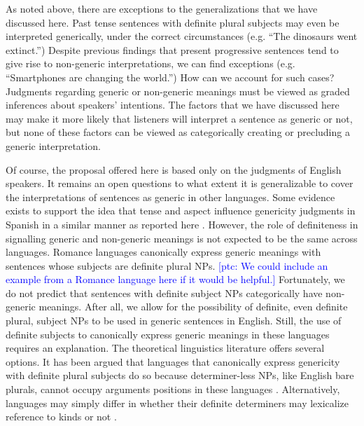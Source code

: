 \documentclass[10pt,letterpaper]{article}
\newcommand{\ptc}[1]{\textcolor{Blue}{[ptc: #1]}}
\begin{document}
As noted above, there are exceptions to the generalizations that we have discussed here. Past tense sentences with definite plural subjects may even be interpreted generically, under the correct circumstances (e.g. ``The dinosaurs went extinct.'') Despite previous findings that present progressive sentences tend to give rise to non-generic interpretations, we can find exceptions (e.g. ``Smartphones are changing the world.'') How can we account for such cases? Judgments regarding generic or non-generic meanings must be viewed as graded inferences about speakers' intentions. The factors that we have discussed here may make it more likely that listeners will interpret a sentence as generic or not, but none of these factors can be viewed as categorically creating or precluding a generic interpretation.

Of course, the proposal offered here is based only on the judgments of English speakers. It remains an open questions to what extent it is generalizable to cover the interpretations of sentences as generic in other languages. Some evidence exists to support the idea that tense and aspect influence genericity judgments in Spanish in a similar manner as reported here \cite{Perez-Leroux:2004}. However, the role of definiteness in signalling generic and non-generic meanings is not expected to be the same across languages. Romance languages canonically express generic meanings with sentences whose subjects are definite plural NPs. \ptc{We could include an example from a Romance language here if it would be helpful.} Fortunately, we do not predict that sentences with definite subject NPs categorically have non-generic meanings. After all, we allow for the possibility of definite, even definite plural, subject NPs to be used in generic sentences in English. Still, the use of definite subjects to canonically express generic meanings in these languages requires an explanation. The theoretical linguistics literature offers several options. It has been argued that languages that canonically express genericity with definite plural subjects do so because determiner-less NPs, like English bare plurals, cannot occupy arguments positions in these languages \cite{Chierchia:1998}. Alternatively, languages may simply differ in whether their definite determiners may lexicalize reference to kinds or not \cite{Dayal:2004}.
\end{document}
